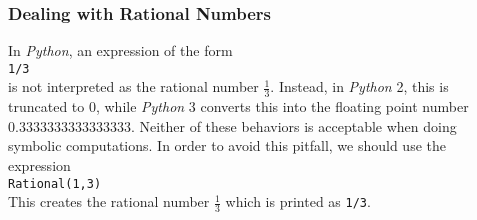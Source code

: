 \documentclass{article}
\newcommand{\ds}{\displaystyle}
\begin{document}
\subsubsection{Dealing with Rational Numbers}
In \textsl{Python}, an expression of the form 
\\[0.2cm]
\hspace*{1.3cm}
\texttt{1/3}
\\[0.2cm]
is not interpreted as the rational number $\frac{1}{3}$.  Instead, in \textsl{Python} 2, this
is truncated to $0$, while \textsl{Python} 3 converts this into the floating point number
$0.3333333333333333$.  Neither of these behaviors is acceptable when doing symbolic computations.
In order to avoid this pitfall, we should use the expression 
\\[0.2cm]
\hspace*{1.3cm}
\texttt{Rational(1,3)}
\\[0.2cm]
This creates the rational number $\ds\frac{1}{3}$ which is printed as \texttt{1/3}.
\end{document}
